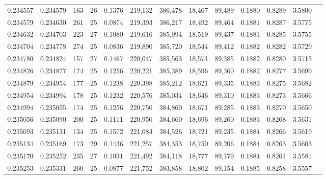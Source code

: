 \begin{tabular}{rrrrrrrrrrrrr}
0.234557 & 0.234579 &   163 &  26 &                                     0.1376 & 219,132 & 386,478 &  18,467 &  89,489 & 0.1880 & 0.8289 & 3.5800 \\
0.234579 & 0.234630 &   261 &  25 &                                     0.0874 & 219,393 & 386,217 &  18,492 &  89,464 & 0.1881 & 0.8287 & 3.5775 \\
0.234632 & 0.234703 &   223 &  27 &                                     0.1080 & 219,616 & 385,994 &  18,519 &  89,437 & 0.1881 & 0.8285 & 3.5755 \\
0.234704 & 0.234778 &   274 &  25 &                                     0.0836 & 219,890 & 385,720 &  18,544 &  89,412 & 0.1882 & 0.8282 & 3.5729 \\
0.234780 & 0.234824 &   157 &  27 &                                     0.1467 & 220,047 & 385,563 &  18,571 &  89,385 & 0.1882 & 0.8280 & 3.5715 \\
0.234826 & 0.234877 &   174 &  25 &                                     0.1256 & 220,221 & 385,389 &  18,596 &  89,360 & 0.1882 & 0.8277 & 3.5699 \\
0.234879 & 0.234954 &   177 &  25 &                                     0.1238 & 220,398 & 385,212 &  18,621 &  89,335 & 0.1883 & 0.8275 & 3.5682 \\
0.234954 & 0.234994 &   178 &  25 &                                     0.1232 & 220,576 & 385,034 &  18,646 &  89,310 & 0.1883 & 0.8273 & 3.5666 \\
0.234994 & 0.235055 &   174 &  25 &                                     0.1256 & 220,750 & 384,860 &  18,671 &  89,285 & 0.1883 & 0.8270 & 3.5650 \\
0.235056 & 0.235090 &   200 &  25 &                                     0.1111 & 220,950 & 384,660 &  18,696 &  89,260 & 0.1883 & 0.8268 & 3.5631 \\
0.235093 & 0.235131 &   134 &  25 &                                     0.1572 & 221,084 & 384,526 &  18,721 &  89,235 & 0.1884 & 0.8266 & 3.5619 \\
0.235134 & 0.235169 &   173 &  29 &                                     0.1436 & 221,257 & 384,353 &  18,750 &  89,206 & 0.1884 & 0.8263 & 3.5603 \\
0.235170 & 0.235252 &   235 &  27 &                                     0.1031 & 221,492 & 384,118 &  18,777 &  89,179 & 0.1884 & 0.8261 & 3.5581 \\
0.235253 & 0.235331 &   260 &  25 &                                     0.0877 & 221,752 & 383,858 &  18,802 &  89,154 & 0.1885 & 0.8258 & 3.5557 \\

\end{tabular}
